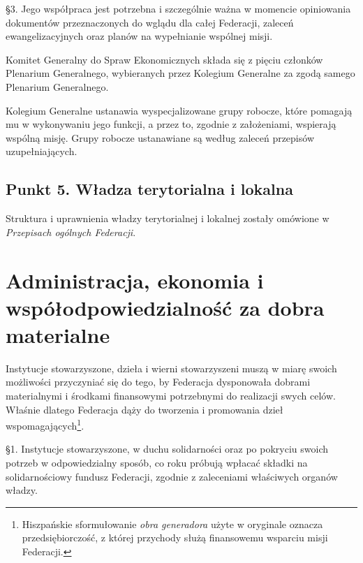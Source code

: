 \S{}3. Jego współpraca jest potrzebna i szczególnie ważna w momencie opiniowania dokumentów przeznaczonych do wglądu dla całej Federacji, zaleceń ewangelizacyjnych oraz planów na wypełnianie wspólnej misji.
 


 Komitet Generalny do Spraw Ekonomicznych składa się z pięciu członków Plenarium Generalnego, wybieranych przez Kolegium Generalne za zgodą samego Plenarium Generalnego.
 


 Kolegium Generalne ustanawia wyspecjalizowane grupy robocze, które pomagają mu w wykonywaniu jego funkcji, a przez to, zgodnie z założeniami, wspierają wspólną misję. Grupy robocze ustanawiane są według zaleceń przepisów uzupełniających.




\section{Punkt 5. Władza terytorialna i lokalna}


 Struktura i uprawnienia władzy terytorialnej i lokalnej zostały omówione w {\em Przepisach ogólnych Federacji}.
 


\chapter{Administracja, ekonomia i współodpowiedzialność za dobra materialne}




 Instytucje stowarzyszone, dzieła i wierni stowarzyszeni muszą w miarę swoich możliwości przyczyniać się do tego, by Federacja dysponowała dobrami materialnymi i środkami finansowymi potrzebnymi do realizacji swych celów. Właśnie dlatego Federacja dąży do tworzenia i promowania dzieł wspomagających\footnote{Hiszpańskie sformułowanie {\em obra generadora} użyte w oryginale oznacza przedsiębiorczość, z której przychody służą finansowemu wsparciu misji Federacji.}.
 


\filbreak{}


 \S{}1. Instytucje stowarzyszone, w duchu solidarności oraz po pokryciu swoich potrzeb w odpowiedzialny sposób, co roku próbują wpłacać składki na solidarnościowy fundusz Federacji, zgodnie z zaleceniami właściwych organów władzy.


